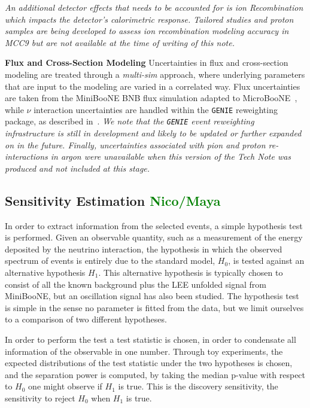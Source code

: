 \documentclass[a4paper]{article}
\begin{document}
\emph{An additional detector effects that needs to be accounted for is ion Recombination which impacts the detector's calorimetric response. Tailored studies and proton samples are being developed to assess ion recombination modeling accuracy in MCC9 but are not available at the time of writing of this note.}
\par \noindent \textbf{Flux and Cross-Section Modeling} Uncertainties in flux and cross-section modeling are treated through a \emph{multi-sim} approach, where underlying parameters that are input to the modeling are varied in a correlated way. Flux uncertainties are taken from the MiniBooNE BNB flux simulation adapted to MicroBooNE~\cite{bib:fluxmcc9,bib:fluxtechnote}, while $\nu$ interaction uncertainties are handled within the \texttt{GENIE} reweighting package, as described in~\cite{bib:geniesupportnote}. \emph{We note that the \texttt{GENIE} event reweighting infrastructure is still in development and likely to be updated or further expanded on in the future. Finally, uncertainties associated with pion and proton re-interactions in argon were unavailable when this version of the Tech Note was produced and not included at this stage.} 

\subsection{Sensitivity Estimation \textcolor{green}{Nico/Maya}}
In order to extract information from the selected events, a simple hypothesis test is performed.
Given an observable quantity, such as a measurement of the energy deposited by the neutrino interaction, the hypothesis in which the observed spectrum of events is entirely due to the standard model, $H_0$, is tested against an alternative hypothesis $H_1$.
This alternative hypothesis is typically chosen to consist of all the known background plus the LEE unfolded signal from MiniBooNE, but an oscillation signal has also been studied.
The hypothesis test is simple in the sense no parameter is fitted from the data, but we limit ourselves to a comparison of two different hypotheses.

In order to perform the test a test statistic is chosen, in order to condensate all information of the observable in one number.
Through toy experiments, the expected distributions of the test statistic under the two hypotheses is chosen, and the separation power is computed, by taking the median p-value with respect to $H_0$ one might observe if $H_1$ is true.
This is the discovery sensitivity, the sensitivity to reject $H_0$ when $H_1$ is true.
\end{document}
